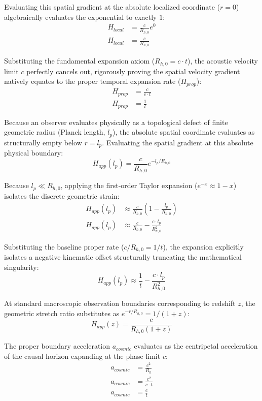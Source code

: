 \documentclass[11pt, a4paper]{article}
\begin{document}
Evaluating this spatial gradient at the absolute localized coordinate ($r = 0$) algebraically evaluates the exponential to exactly $1$:
\begin{align}
    H_{local} &= \frac{c}{R_{h,0}} e^0 \\
    H_{local} &= \frac{c}{R_{h,0}}
\end{align}

Substituting the fundamental expansion axiom ($R_{h,0} = c \cdot t$), the acoustic velocity limit $c$ perfectly cancels out, rigorously proving the spatial velocity gradient natively equates to the proper temporal expansion rate ($H_{prop}$):
\begin{align}
    H_{prop} &= \frac{c}{c \cdot t} \\
    H_{prop} &= \frac{1}{t}
\end{align}

Because an observer evaluates physically as a topological defect of finite geometric radius (Planck length, $l_p$), the absolute spatial coordinate evaluates as structurally empty below $r = l_p$. Evaluating the spatial gradient at this absolute physical boundary:
\begin{equation}
    H_{app}(l_p) = \frac{c}{R_{h,0}} e^{-l_p/R_{h,0}}
\end{equation}

Because $l_p \ll R_{h,0}$, applying the first-order Taylor expansion ($e^{-x} \approx 1 - x$) isolates the discrete geometric strain:
\begin{align}
    H_{app}(l_p) &\approx \frac{c}{R_{h,0}} \left( 1 - \frac{l_p}{R_{h,0}} \right) \\
    H_{app}(l_p) &\approx \frac{c}{R_{h,0}} - \frac{c \cdot l_p}{R_{h,0}^2}
\end{align}

Substituting the baseline proper rate ($c/R_{h,0} = 1/t$), the expansion explicitly isolates a negative kinematic offset structurally truncating the mathematical singularity:
\begin{equation}
    H_{app}(l_p) \approx \frac{1}{t} - \frac{c \cdot l_p}{R_{h,0}^2}
\end{equation}

At standard macroscopic observation boundaries corresponding to redshift $z$, the geometric stretch ratio substitutes as $e^{-r/R_{h,0}} = 1/(1+z)$:
\begin{equation}
    H_{app}(z) = \frac{c}{R_{h,0}(1+z)}
\end{equation}

The proper boundary acceleration $a_{cosmic}$ evaluates as the centripetal acceleration of the causal horizon expanding at the phase limit $c$:
\begin{align}
    a_{cosmic} &= \frac{c^2}{R_h} \\
    a_{cosmic} &= \frac{c^2}{c \cdot t} \\
    a_{cosmic} &= \frac{c}{t}
\end{align}
\end{document}
